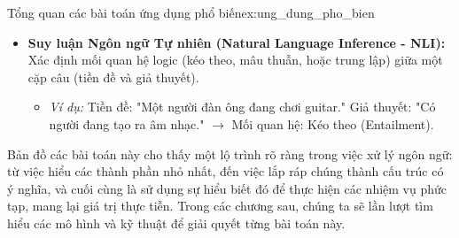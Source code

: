 \begin{example}{Tổng quan các bài toán ứng dụng phổ biến}{ex:ung_dung_pho_bien}
\begin{itemize}
            \begin{itemize}
                \item \textit{Ví dụ:} Chatbot hỗ trợ khách hàng, trợ lý ảo.
            \end{itemize}
            \item \textbf{Suy luận Ngôn ngữ Tự nhiên (Natural Language Inference - NLI):} Xác định mối quan hệ logic (kéo theo, mâu thuẫn, hoặc trung lập) giữa một cặp câu (tiền đề và giả thuyết).
            \begin{itemize}
                \item \textit{Ví dụ:} Tiền đề: "Một người đàn ông đang chơi guitar." Giả thuyết: "Có người đang tạo ra âm nhạc." $\rightarrow$ Mối quan hệ: Kéo theo (Entailment).
            \end{itemize}
    \end{itemize}
\end{example}

Bản đồ các bài toán này cho thấy một lộ trình rõ ràng trong việc xử lý ngôn ngữ: từ việc hiểu các thành phần nhỏ nhất, đến việc lắp ráp chúng thành cấu trúc có ý nghĩa, và cuối cùng là sử dụng sự hiểu biết đó để thực hiện các nhiệm vụ phức tạp, mang lại giá trị thực tiễn. Trong các chương sau, chúng ta sẽ lần lượt tìm hiểu các mô hình và kỹ thuật để giải quyết từng bài toán này.